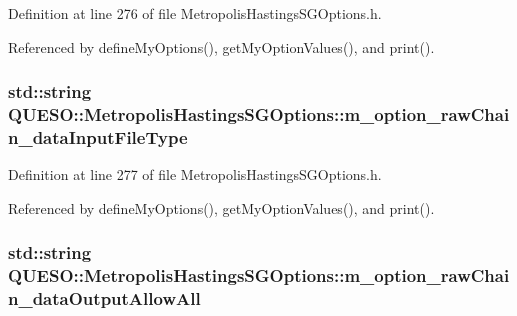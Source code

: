 Definition at line 276 of file Metropolis\-Hastings\-S\-G\-Options.\-h.



Referenced by define\-My\-Options(), get\-My\-Option\-Values(), and print().

\hypertarget{class_q_u_e_s_o_1_1_metropolis_hastings_s_g_options_a1e84e51f68d6be34fa1975950136a6b5}{
\subsubsection[{m\-\_\-option\-\_\-raw\-Chain\-\_\-data\-Input\-File\-Type}]{\setlength{\rightskip}{0pt plus 5cm}std\-::string Q\-U\-E\-S\-O\-::\-Metropolis\-Hastings\-S\-G\-Options\-::m\-\_\-option\-\_\-raw\-Chain\-\_\-data\-Input\-File\-Type\hspace{0.3cm}{\ttfamily [private]}}}\label{class_q_u_e_s_o_1_1_metropolis_hastings_s_g_options_a1e84e51f68d6be34fa1975950136a6b5}


Definition at line 277 of file Metropolis\-Hastings\-S\-G\-Options.\-h.



Referenced by define\-My\-Options(), get\-My\-Option\-Values(), and print().

\hypertarget{class_q_u_e_s_o_1_1_metropolis_hastings_s_g_options_a336b749a8e06848243cf5bfbab2e43a6}{
\subsubsection[{m\-\_\-option\-\_\-raw\-Chain\-\_\-data\-Output\-Allow\-All}]{\setlength{\rightskip}{0pt plus 5cm}std\-::string Q\-U\-E\-S\-O\-::\-Metropolis\-Hastings\-S\-G\-Options\-::m\-\_\-option\-\_\-raw\-Chain\-\_\-data\-Output\-Allow\-All\hspace{0.3cm}{\ttfamily [private]}}}\label{class_q_u_e_s_o_1_1_metropolis_hastings_s_g_options_a336b749a8e06848243cf5bfbab2e43a6}



